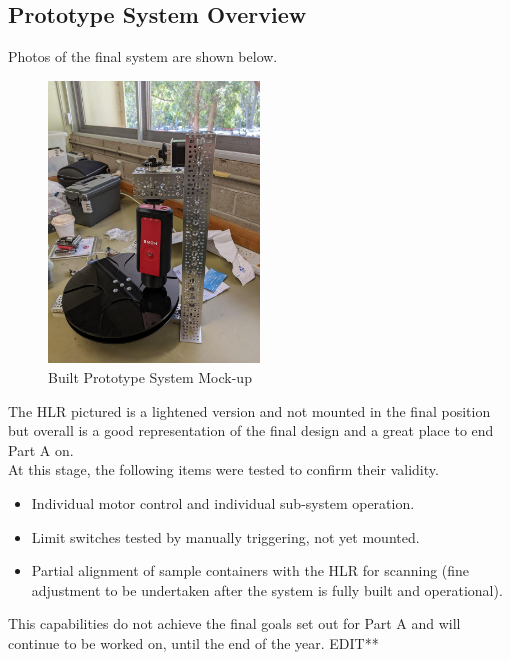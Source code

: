 \documentclass{UoNMCHA}
\numberwithin{equation}{section}
\begin{document}
\subsection{Prototype System Overview}
Photos of the final system are shown below.\\
\begin{figure}[h]
\centering
\includegraphics[width=0.5\textwidth]{PROTOTYPE_MOCK.jpg}
\caption{Built Prototype System Mock-up}
\label{fig:Prototype V1} 
\end{figure}
The HLR pictured is a lightened version and not mounted in the final position but overall is a good representation of the final design and a great place to end Part A on.\\
At this stage, the following items were tested to confirm their validity.\\ 
\begin{itemize}
	\item Individual motor control and individual sub-system operation.
	\item Limit switches tested by manually triggering, not yet mounted.
	\item Partial alignment of sample containers with the HLR for scanning (fine adjustment to be undertaken after the system is fully built and operational).
\end{itemize}
This capabilities do not achieve the final goals set out for Part A and will continue to be worked on, until the end of the year. EDIT** \\
\end{document}
